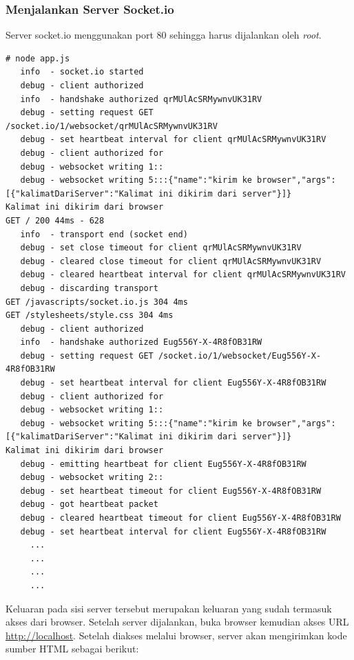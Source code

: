 \subsubsection{Menjalankan Server Socket.io}

Server socket.io menggunakan port 80 sehingga harus dijalankan oleh \textit{root}. 

\lstset{language=Bash,caption=Menjalankan server Socket.io}
\begin{lstlisting}
# node app.js 
   info  - socket.io started
   debug - client authorized
   info  - handshake authorized qrMUlAcSRMywnvUK31RV
   debug - setting request GET /socket.io/1/websocket/qrMUlAcSRMywnvUK31RV
   debug - set heartbeat interval for client qrMUlAcSRMywnvUK31RV
   debug - client authorized for 
   debug - websocket writing 1::
   debug - websocket writing 5:::{"name":"kirim ke browser","args":[{"kalimatDariServer":"Kalimat ini dikirim dari server"}]}
Kalimat ini dikirim dari browser
GET / 200 44ms - 628
   info  - transport end (socket end)
   debug - set close timeout for client qrMUlAcSRMywnvUK31RV
   debug - cleared close timeout for client qrMUlAcSRMywnvUK31RV
   debug - cleared heartbeat interval for client qrMUlAcSRMywnvUK31RV
   debug - discarding transport
GET /javascripts/socket.io.js 304 4ms
GET /stylesheets/style.css 304 4ms
   debug - client authorized
   info  - handshake authorized Eug556Y-X-4R8fOB31RW
   debug - setting request GET /socket.io/1/websocket/Eug556Y-X-4R8fOB31RW
   debug - set heartbeat interval for client Eug556Y-X-4R8fOB31RW
   debug - client authorized for 
   debug - websocket writing 1::
   debug - websocket writing 5:::{"name":"kirim ke browser","args":[{"kalimatDariServer":"Kalimat ini dikirim dari server"}]}
Kalimat ini dikirim dari browser
   debug - emitting heartbeat for client Eug556Y-X-4R8fOB31RW
   debug - websocket writing 2::
   debug - set heartbeat timeout for client Eug556Y-X-4R8fOB31RW
   debug - got heartbeat packet
   debug - cleared heartbeat timeout for client Eug556Y-X-4R8fOB31RW
   debug - set heartbeat interval for client Eug556Y-X-4R8fOB31RW
	 ...
	 ...
	 ...
	 ...
\end{lstlisting}

Keluaran pada sisi server tersebut merupakan keluaran yang sudah termasuk akses dari browser. Setelah server dijalankan, buka browser kemudian akses URL \url{http://localhost}. Setelah diakses melalui browser, server akan mengirimkan kode sumber HTML sebagai berikut:

